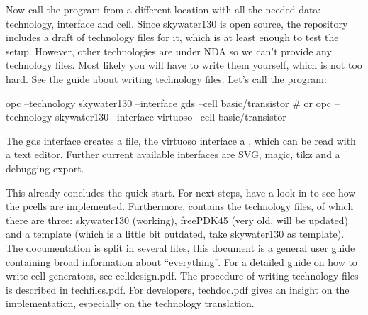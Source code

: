 Now call the program from a different location with all the needed data: technology, interface and cell. Since skywater130 is open source, the repository includes a
draft of technology files for it, which is at least enough to test the setup. However, other technologies are under NDA so we can't provide any technology files.
Most likely you will have to write them yourself, which is not too hard. See the guide about writing technology files. Let's call the program:
\begin{shellcode}
    opc --technology skywater130 --interface gds --cell basic/transistor
    # or
    opc --technology skywater130 --interface virtuoso --cell basic/transistor
\end{shellcode}
The gds interface creates a  file, the virtuoso interface a , which can be read with a text editor. Further
current available interfaces are SVG, magic, tikz and a debugging export.

This already concludes the quick start. For next steps, have a look in  to see how the pcells are implemented. Furthermore, 
contains the technology files, of which there are three: skywater130 (working), freePDK45 (very old, will be updated) and a template (which is a little bit outdated,
take skywater130 as template). The documentation is split in several files, this document is a general user guide containing broad information about
\enquote{everything}. For a detailed guide on how to write cell generators, see celldesign.pdf. The procedure of writing technology files is described in
techfiles.pdf. For developers, techdoc.pdf gives an insight on the implementation, especially on the technology translation.


